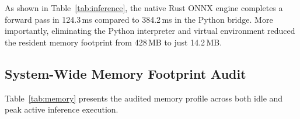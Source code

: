 \documentclass[conference]{IEEEtran}
\begin{document}
    \begin{table}[htbp]
    \caption{Inference Engine Benchmark on CPU (640$\times$480 Frames)}
    \label{tab:inference}
    \centering
    \end{table}
    
    As shown in Table~\ref{tab:inference}, the native Rust ONNX engine completes a forward pass in 124.3\,ms compared to 384.2\,ms in the Python bridge. More
    importantly, eliminating the Python interpreter and virtual environment reduced the resident memory footprint from 428\,MB to just 14.2\,MB.
    
    \subsection{System-Wide Memory Footprint Audit}
    Table~\ref{tab:memory} presents the audited memory profile across both idle and peak active inference execution.
    
\end{document}
